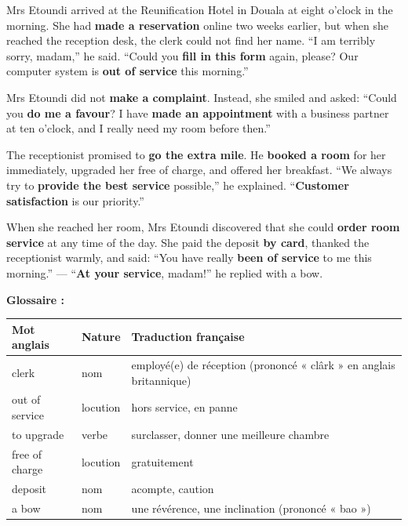\documentclass[11pt]{article}
\begin{document}
\begin{textebox}
Mrs Etoundi arrived at the Reunification Hotel in Douala at eight o'clock in the morning. She had \textbf{made a reservation} online two weeks earlier, but when she reached the reception desk, the clerk could not find her name. “I am terribly sorry, madam,” he said. “Could you \textbf{fill in this form} again, please? Our computer system is \textbf{out of service} this morning.”

Mrs Etoundi did not \textbf{make a complaint}. Instead, she smiled and asked: “Could you \textbf{do me a favour}? I have \textbf{made an appointment} with a business partner at ten o'clock, and I really need my room before then.”

The receptionist promised to \textbf{go the extra mile}. He \textbf{booked a room} for her immediately, upgraded her free of charge, and offered her breakfast. “We always try to \textbf{provide the best service} possible,” he explained. “\textbf{Customer satisfaction} is our priority.”

When she reached her room, Mrs Etoundi discovered that she could \textbf{order room service} at any time of the day. She paid the deposit \textbf{by card}, thanked the receptionist warmly, and said: “You have really \textbf{been of service} to me this morning.” — “\textbf{At your service}, madam!” he replied with a bow.
\end{textebox}

\textbf{Glossaire :}

\begin{center}
\begin{tabularx}{\linewidth}{|l|l|X|}
\hline
\rowcolor{popblueL} Mot anglais & Nature & Traduction française \\
\hline
clerk & nom & employé(e) de réception (prononcé « clârk » en anglais britannique) \\
\hline
out of service & locution & hors service, en panne \\
\hline
to upgrade & verbe & surclasser, donner une meilleure chambre \\
\hline
free of charge & locution & gratuitement \\
\hline
deposit & nom & acompte, caution \\
\hline
a bow & nom & une révérence, une inclination (prononcé « bao ») \\
\hline
\end{tabularx}
\end{center}
\end{document}
